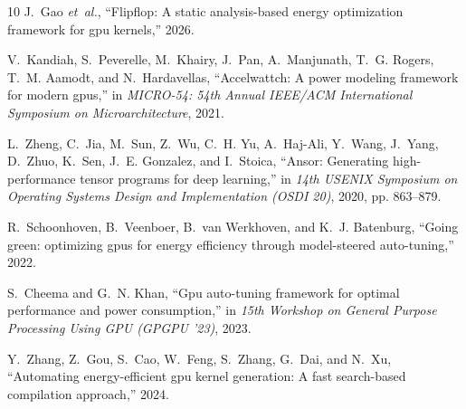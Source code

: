 \documentclass[10pt,journal,compsoc]{IEEEtran}
\begin{document}
\begin{thebibliography}{10}
J.~Gao \emph{et~al.}, ``Flipflop: A static analysis-based energy optimization
  framework for gpu kernels,'' 2026.

V.~Kandiah, S.~Peverelle, M.~Khairy, J.~Pan, A.~Manjunath, T.~G. Rogers, T.~M.
  Aamodt, and N.~Hardavellas, ``Accelwattch: A power modeling framework for
  modern gpus,'' in \emph{MICRO-54: 54th Annual IEEE/ACM International
  Symposium on Microarchitecture}, 2021.

L.~Zheng, C.~Jia, M.~Sun, Z.~Wu, C.~H. Yu, A.~Haj-Ali, Y.~Wang, J.~Yang,
  D.~Zhuo, K.~Sen, J.~E. Gonzalez, and I.~Stoica, ``Ansor: Generating
  high-performance tensor programs for deep learning,'' in \emph{14th USENIX
  Symposium on Operating Systems Design and Implementation (OSDI 20)}, 2020,
  pp. 863--879.

R.~Schoonhoven, B.~Veenboer, B.~van Werkhoven, and K.~J. Batenburg, ``Going
  green: optimizing gpus for energy efficiency through model-steered
  auto-tuning,'' 2022.

S.~Cheema and G.~N. Khan, ``Gpu auto-tuning framework for optimal performance
  and power consumption,'' in \emph{15th Workshop on General Purpose Processing
  Using GPU (GPGPU '23)}, 2023.

Y.~Zhang, Z.~Gou, S.~Cao, W.~Feng, S.~Zhang, G.~Dai, and N.~Xu, ``Automating
  energy-efficient gpu kernel generation: A fast search-based compilation
  approach,'' 2024.

\end{thebibliography}
\end{document}
